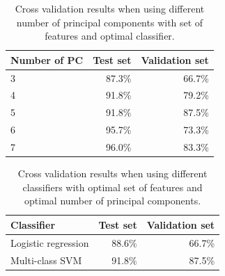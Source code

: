 \begin{table}
\begin{center}
\begin{tabular}{| l | r | r |}
\hline
Number of PC & Test set & Validation set \\ \hline
3 & 87.3\% & 66.7\% \\
4 & 91.8\% & 79.2\% \\
5 & 91.8\% & 87.5\% \\
6 & 95.7\% & 73.3\% \\
7 & 96.0\% & 83.3\% \\
\hline
\end{tabular}
\end{center}
\caption{Cross validation results when using different number of principal components with set of features and optimal classifier.}
\label{tab:pca}
\end{table}

\begin{table}
\begin{center}
\begin{tabular}{| l | r | r |}
\hline
Classifier & Test set & Validation set \\ \hline
Logistic regression & 88.6\% & 66.7\% \\
Multi-class SVM & 91.8\% & 87.5\% \\
\hline
\end{tabular}
\end{center}
\caption{Cross validation results when using different classifiers with optimal set of features and optimal number of principal components.}
\label{tab:classify}
\end{table}
